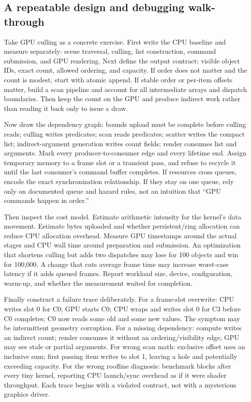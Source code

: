 \subsection{A repeatable design and debugging walk-through}\label{05-engine-i-ch019-a-repeatable-design-and-debugging-walk-through}

\hypertarget{05-engine-i-ch019-a-repeatable-design-and-debugging-walk-through}{}

Take GPU culling as a concrete exercise. First write the CPU baseline and measure separately: scene traversal, culling, list construction, command submission, and GPU rendering. Next define the output contract: visible object IDs, exact count, allowed ordering, and capacity. If order does not matter and the count is modest, start with atomic append. If stable order or per-item offsets matter, build a scan pipeline and account for all intermediate arrays and dispatch boundaries. Then keep the count on the GPU and produce indirect work rather than reading it back only to issue a draw.

Now draw the dependency graph: bounds upload must be complete before culling reads; culling writes predicates; scan reads predicates; scatter writes the compact list; indirect-argument generation writes count fields; render consumes list and arguments. Mark every producer-to-consumer edge and every lifetime end. Assign temporary memory to a frame slot or a transient pass, and refuse to recycle it until the last consumer's command buffer completes. If resources cross queues, encode the exact synchronization relationship. If they stay on one queue, rely only on documented queue and hazard rules, not an intuition that ``GPU commands happen in order.''

Then inspect the cost model. Estimate arithmetic intensity for the kernel's data movement. Estimate bytes uploaded and whether persistent/ring allocation can reduce CPU allocation overhead. Measure GPU timestamps around the actual stages and CPU wall time around preparation and submission. An optimization that shortens culling but adds two dispatches may lose for 100 objects and win for 100,000. A change that cuts average frame time may increase worst-case latency if it adds queued frames. Report workload size, device, configuration, warm-up, and whether the measurement waited for completion.

Finally construct a failure trace deliberately. For a frame-slot overwrite: CPU writes slot 0 for C0; GPU starts C0; CPU wraps and writes slot 0 for C3 before C0 completes; C0 now reads some old and some new values. The symptom may be intermittent geometry corruption. For a missing dependency: compute writes an indirect count; render consumes it without an ordering/visibility edge; GPU may see stale or partial arguments. For wrong scan math: exclusive offset uses an inclusive sum; first passing item writes to slot 1, leaving a hole and potentially exceeding capacity. For the wrong roofline diagnosis: benchmark blocks after every tiny kernel, reporting CPU launch/sync overhead as if it were shader throughput. Each trace begins with a violated contract, not with a mysterious graphics driver.

